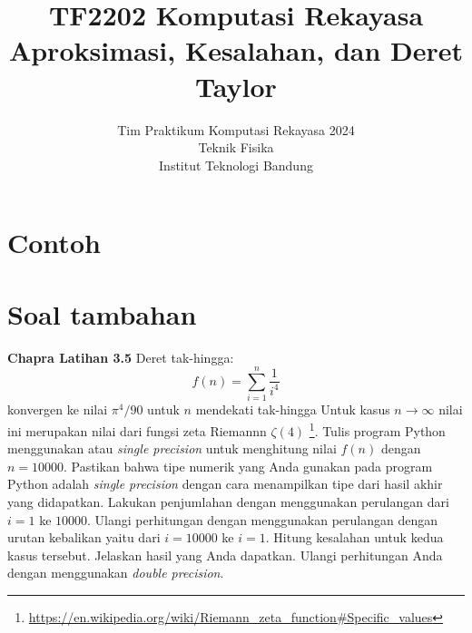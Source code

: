 



\title{%
{\small TF2202 Komputasi Rekayasa}\\
Aproksimasi, Kesalahan, dan Deret Taylor
}
\author{Tim Praktikum Komputasi Rekayasa 2024\\
Teknik Fisika\\
Institut Teknologi Bandung}
\date{}
\maketitle


\section{Contoh}








\section{Soal tambahan}

\begin{soal}
\textbf{Chapra Latihan 3.5}
Deret tak-hingga:
\begin{equation*}
f(n) = \sum_{i=1}^{n} \frac{1}{i^4}
\end{equation*}
konvergen ke nilai $\pi^{4}/90$ untuk $n$ mendekati tak-hingga
Untuk kasus $n \rightarrow \infty$ nilai ini merupakan nilai dari fungsi
zeta Riemannn $\zeta(4)$
\footnote{{\scriptsize\url{https://en.wikipedia.org/wiki/Riemann_zeta_function\#Specific_values}}}.
Tulis program Python menggunakan  atau
\textit{single precision} untuk menghitung
nilai $f(n)$ dengan $n=10000$.
Pastikan bahwa tipe numerik yang Anda gunakan pada program Python
adalah \textit{single precision} dengan cara menampilkan tipe dari hasil akhir yang didapatkan.
Lakukan penjumlahan dengan menggunakan perulangan
dari $i=1$ ke $10000$. Ulangi perhitungan dengan menggunakan perulangan
dengan urutan kebalikan yaitu dari $i=10000$ ke $i=1$. Hitung kesalahan untuk
kedua kasus tersebut.
Jelaskan hasil yang Anda dapatkan.
Ulangi perhitungan Anda dengan menggunakan \textit{double precision}.
\end{soal}

